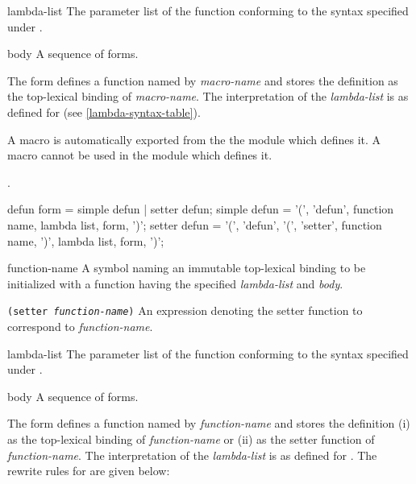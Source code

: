 \begin{optDefinition}
\begin{arguments}
    \item[lambda-list] The parameter list of the function conforming to the
    syntax specified under .

    \item[body] A sequence of forms.
\end{arguments}
%
\remarks%
The  form defines a function named by
{\em macro-name} and stores the definition as the top-lexical binding of {\em
    macro-name}.  The interpretation
of the {\em lambda-list} is as defined for  (see
\ref{lambda-syntax-table}).
%
\begin{note}
    A macro is automatically exported from the the module which defines it.  A
    macro cannot be used in the module which defines it.
\end{note}
%
\seealso%
.

%
\Syntax
\savesyntax{}\vbox{\small\syntax
defun form
   = simple defun
   | setter defun;
simple defun
   = '(', 'defun', function name, lambda list,
     {form}, ')';
setter defun
   = '(', 'defun',
          '(', 'setter', function name, ')',
          lambda list, {form}, ')';
\endsyntax}
%
\begin{arguments}
    \item[function-name] A symbol naming an immutable top-lexical binding to be
    initialized with a function having the specified {\em lambda-list} and {\em
        body}.

    \item[{\tt (setter {\em function-name})}] An expression denoting the setter
    function to correspond to {\em function-name}.

    \item[lambda-list] The parameter list of the function conforming to the
    syntax specified under .

    \item[body] A sequence of forms.
\end{arguments}
%
\remarks%
The  form defines a function named by {\em function-name} and
stores the definition (i) as the top-lexical binding of {\em function-name} or
(ii) as the setter function of {\em function-name}.  The interpretation of the
{\em lambda-list} is as defined for .  The rewrite rules for
 are given below:


\end{optDefinition}
